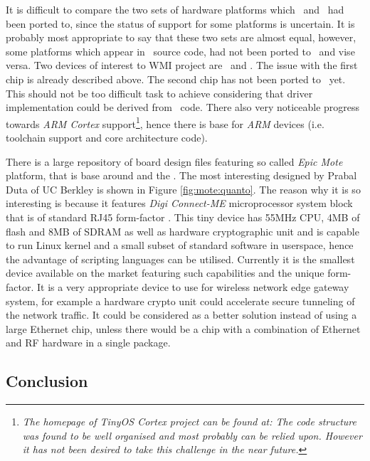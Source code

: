   It is difficult to compare the two sets of hardware platforms which
 \TinyOS\ and \Contiki\ had been ported to, since the status of support
 for some platforms is uncertain. It is probably most appropriate to
 say that these two sets are almost equal, however, some platforms
 which appear in \Contiki\ source code, had not been ported to \TinyOS\
 and vise versa. Two devices of interest to WMI project are \RFA\ and
 \MCX. The issue with the first chip is already described above.
 The second chip has not been ported to \TinyOS\ yet. This should not
 be too difficult task to achieve considering that driver implementation
 could be derived from \Contiki\ code. There also very noticeable
 progress towards \emph{ARM Cortex} support\footnote{\emph{The homepage
 of TinyOS Cortex project can be found at:
 The code structure was found to be well organised and most probably
 can be relied upon. However it has not been desired to take this
 challenge in the near future.}}, hence there is base for \emph{ARM}
 devices (i.e. toolchain support and core architecture code).
 

  There is a large repository of board design files featuring so called
 \emph{Epic Mote} platform, that is base around \Chip{CC2420} and the
 \Chip{MSP430} \cite{epic:homepage}. The most interesting designed by
 Prabal Duta of UC Berkley \cite{duta:homepage} is shown in Figure
 \ref{fig:mote:quanto}. The reason why it is so interesting is because
 it features \emph{Digi Connect-ME} microprocessor system block that is
 of standard RJ45 form-factor \cite{digi:connect-me}. This tiny device
 has 55MHz \Chip{ARM7TDMI} CPU, 4MB of flash and 8MB of SDRAM as well as
 hardware cryptographic unit and is capable to run Linux kernel and a
 small subset of standard software in userspace, hence the advantage of
 scripting languages can be utilised. Currently it is the smallest
 device available on the market featuring such capabilities and
 the unique form-factor. It is a very appropriate device to use for
 wireless network edge gateway system, for example a hardware crypto
 unit could accelerate secure tunneling of the network traffic. It
 could be considered as a better solution instead of using a large
 Ethernet chip, unless there would be a chip with a combination of
 Ethernet and RF hardware in a single package.



\subsection{Conclusion}

